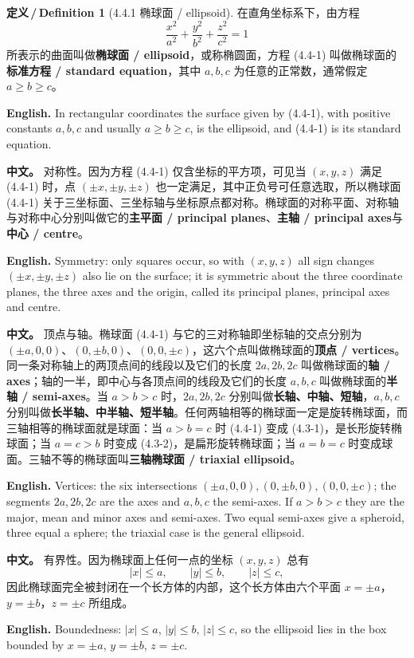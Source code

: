 \documentclass[UTF8,11pt,a4paper]{ctexart}
\newcommand{\APS}[2]{\par\noindent\textbf{中文。} #1\par\noindent\textbf{English.} #2\par\smallskip}
\newcommand{\EN}[1]{\par\noindent \textbf{English.} #1\par}
\theoremstyle{definition}
\newtheorem*{definition}{定义\,/\,Definition}
\begin{document}
\begin{definition}[4.4.1 椭球面 / ellipsoid]\label{def:ellipsoid}
在直角坐标系下，由方程
\[
\frac{x^2}{a^2}+\frac{y^2}{b^2}+\frac{z^2}{c^2}=1\tag{4.4-1}
\]
所表示的曲面叫做\textbf{椭球面 / ellipsoid}，或称椭圆面，方程 (4.4-1) 叫做椭球面的\textbf{标准方程 / standard equation}，其中 $a,b,c$ 为任意的正常数，通常假定 $a\ge b\ge c$。
\EN{In rectangular coordinates the surface given by (4.4-1), with positive constants $a,b,c$ and usually $a\ge b\ge c$, is the ellipsoid, and (4.4-1) is its standard equation.}
\end{definition}

\APS{对称性。因为方程 (4.4-1) 仅含坐标的平方项，可见当 $(x,y,z)$ 满足 (4.4-1) 时，点 $(\pm x,\pm y,\pm z)$ 也一定满足，其中正负号可任意选取，所以椭球面 (4.4-1) 关于三坐标面、三坐标轴与坐标原点都对称。椭球面的对称平面、对称轴与对称中心分别叫做它的\textbf{主平面 / principal planes}、\textbf{主轴 / principal axes}与\textbf{中心 / centre}。}{Symmetry: only squares occur, so with $(x,y,z)$ all sign changes $(\pm x,\pm y,\pm z)$ also lie on the surface; it is symmetric about the three coordinate planes, the three axes and the origin, called its principal planes, principal axes and centre.}

\APS{顶点与轴。椭球面 (4.4-1) 与它的三对称轴即坐标轴的交点分别为 $(\pm a,0,0)$、$(0,\pm b,0)$、$(0,0,\pm c)$，这六个点叫做椭球面的\textbf{顶点 / vertices}。同一条对称轴上的两顶点间的线段以及它们的长度 $2a,2b,2c$ 叫做椭球面的\textbf{轴 / axes}；轴的一半，即中心与各顶点间的线段及它们的长度 $a,b,c$ 叫做椭球面的\textbf{半轴 / semi-axes}。当 $a>b>c$ 时，$2a,2b,2c$ 分别叫做\textbf{长轴、中轴、短轴}，$a,b,c$ 分别叫做\textbf{长半轴、中半轴、短半轴}。任何两轴相等的椭球面一定是旋转椭球面，而三轴相等的椭球面就是球面：当 $a>b=c$ 时 (4.4-1) 变成 (4.3-1)，是长形旋转椭球面；当 $a=c>b$ 时变成 (4.3-2)，是扁形旋转椭球面；当 $a=b=c$ 时变成球面。三轴不等的椭球面叫\textbf{三轴椭球面 / triaxial ellipsoid}。}{Vertices: the six intersections $(\pm a,0,0),(0,\pm b,0),(0,0,\pm c)$; the segments $2a,2b,2c$ are the axes and $a,b,c$ the semi-axes. If $a>b>c$ they are the major, mean and minor axes and semi-axes. Two equal semi-axes give a spheroid, three equal a sphere; the triaxial case is the general ellipsoid.}

\APS{有界性。因为椭球面上任何一点的坐标 $(x,y,z)$ 总有
\[
|x|\le a,\qquad |y|\le b,\qquad |z|\le c,
\]
因此椭球面完全被封闭在一个长方体的内部，这个长方体由六个平面 $x=\pm a$，$y=\pm b$，$z=\pm c$ 所组成。}{Boundedness: $|x|\le a$, $|y|\le b$, $|z|\le c$, so the ellipsoid lies in the box bounded by $x=\pm a$, $y=\pm b$, $z=\pm c$.}
\end{document}
